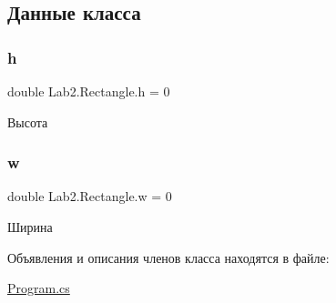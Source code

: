 \subsection{Данные класса}
\mbox{\label{class_lab2_1_1_rectangle_a94ac15fb6583c21bf4c47bc8cf680aa2}} 
\subsubsection{\texorpdfstring{h}{h}}
{\footnotesize\ttfamily double Lab2.\+Rectangle.\+h = 0}



Высота 

\mbox{\label{class_lab2_1_1_rectangle_a074656a9861271f6b4e17319b7bfc6bb}} 
\subsubsection{\texorpdfstring{w}{w}}
{\footnotesize\ttfamily double Lab2.\+Rectangle.\+w = 0}



Ширина 



Объявления и описания членов класса находятся в файле\+:\begin{DoxyCompactItemize}
\item 
\hyperlink{_program_8cs}{Program.\+cs}\end{DoxyCompactItemize}
